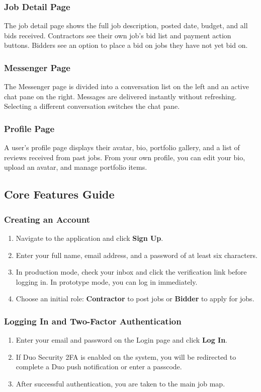 \documentclass[11pt]{article}
\begin{document}
\subsubsection{Job Detail Page}
The job detail page shows the full job description, posted date, budget, and all
bids received. Contractors see their own job's bid list and payment action buttons.
Bidders see an option to place a bid on jobs they have not yet bid on.

\subsubsection{Messenger Page}
The Messenger page is divided into a conversation list on the left and an active
chat pane on the right. Messages are delivered instantly without refreshing. Selecting
a different conversation switches the chat pane.

\subsubsection{Profile Page}
A user's profile page displays their avatar, bio, portfolio gallery, and a list of
reviews received from past jobs. From your own profile, you can edit your bio, upload
an avatar, and manage portfolio items.

\subsection{Core Features Guide}

\subsubsection{Creating an Account}
\begin{enumerate}[leftmargin=1.8em]
  \item Navigate to the application and click \textbf{Sign Up}.
  \item Enter your full name, email address, and a password of at least six characters.
  \item In production mode, check your inbox and click the verification link before logging in. In prototype mode, you can log in immediately.
  \item Choose an initial role: \textbf{Contractor} to post jobs or \textbf{Bidder} to apply for jobs.
\end{enumerate}

\subsubsection{Logging In and Two-Factor Authentication}
\begin{enumerate}[leftmargin=1.8em]
  \item Enter your email and password on the Login page and click \textbf{Log In}.
  \item If Duo Security 2FA is enabled on the system, you will be redirected to complete a Duo push notification or enter a passcode.
  \item After successful authentication, you are taken to the main job map.
\end{enumerate}
\end{document}
